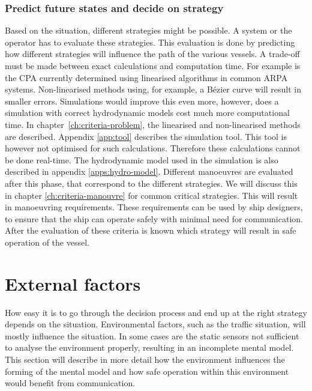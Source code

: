 \subsubsection{Predict future states and decide on strategy}
Based on the situation, different strategies might be possible. A system or the operator has to evaluate these strategies. This evaluation is done by predicting how different strategies will influence the path of the various vessels. A trade-off must be made between exact calculations and computation time. For example is the \acf{CPA} currently determined using linearised algorithms in common \ac{ARPA} systems. Non-linearised methods using, for example, a Bézier curve will result in smaller errors. Simulations would improve this even more, however, does a simulation with correct hydrodynamic models cost much more computational time. In chapter~\ref{ch:criteria-problem}, the linearised and non-linearised methods are described. Appendix \ref{app:tool} describes the simulation tool. This tool is however not optimised for such calculations. Therefore these calculations cannot be done real-time. The hydrodynamic model used in the simulation is also described in appendix \ref{apps:hydro-model}. Different manoeuvres are evaluated after this phase, that correspond to the different strategies. We will discuss this in chapter \ref{ch:criteria-manouvre} for common critical strategies. This will result in manoeuvring requirements. These requirements can be used by ship designers, to ensure that the ship can operate safely with minimal need for communication.
After the evaluation of these criteria is known which strategy will result in safe operation of the vessel.

\newpage
\section{External factors}
How easy it is to go through the decision process and end up at the right strategy depends on the situation. Environmental factors, such as the traffic situation, will mostly influence the situation. In some cases are the static sensors not sufficient to analyse the environment properly, resulting in an incomplete mental model. This section will describe in more detail how the environment influences the forming of the mental model and how safe operation within this environment would benefit from communication. 

